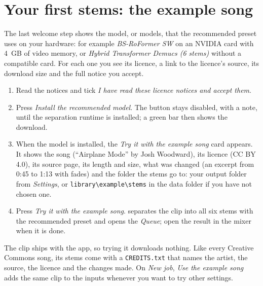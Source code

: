 \documentclass{covermaker}
\begin{document}
\section{Your first stems: the example song}
The last welcome step shows the model, or models, that the recommended preset
uses on your hardware: for example \emph{BS-RoFormer SW} on an NVIDIA card with
4~GB of video memory, or \emph{Hybrid Transformer Demucs (6 stems)} without a
compatible card. For each one you see its licence, a link to the licence's
source, its download size and the full notice you accept.
\begin{enumerate}
  \item Read the notices and tick \emph{I have read these licence notices and
        accept them}.
  \item Press \emph{Install the recommended model}. The button stays disabled,
        with a note, until the separation runtime is installed; a green bar
        then shows the download.
  \item When the model is installed, the \emph{Try it with the example song}
        card appears. It shows the song (``Airplane Mode'' by Josh Woodward),
        its licence (CC BY 4.0), its source page, its length and size, what
        was changed (an excerpt from 0:45 to 1:13 with fades) and the folder
        the stems go to: your output folder from \emph{Settings}, or
        \texttt{library\textbackslash example\textbackslash stems} in the data
        folder if you have not chosen one.
  \item Press \emph{Try it with the example song}. \CM{} separates the clip
        into all six stems with the recommended preset and opens the
        \emph{Queue}; open the result in the mixer when it is done.
\end{enumerate}
The clip ships with the app, so trying it downloads nothing. Like every
Creative Commons song, its stems come with a \texttt{CREDITS.txt} that names
the artist, the source, the licence and the changes made. On \emph{New job},
\emph{Use the example song} adds the same clip to the inputs whenever you want
to try other settings.
\end{document}
